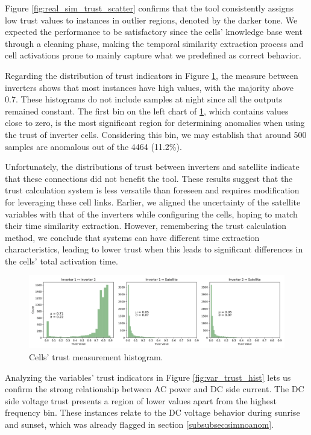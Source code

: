 Figure \ref{fig:real_sim_trust_scatter} confirms that the tool consistently assigns low trust values to instances in outlier regions, denoted by the darker tone. We expected the performance to be satisfactory since the cells' knowledge base went through a cleaning phase, making the temporal similarity extraction process and cell activations prone to mainly capture what we predefined as correct behavior.

Regarding the distribution of trust indicators in Figure \ref{fig:cell_trust_hist}, the measure between inverters shows that most instances have high values, with the majority above 0.7. These histograms do not include samples at night since all the outputs remained constant. The first bin on the left chart of \ref{fig:cell_trust_hist}, which contains values close to zero, is the most significant region for determining anomalies when using the trust of inverter cells. Considering this bin, we may establish that around 500 samples are anomalous out of the 4464 (11.2\%).

Unfortunately, the distributions of trust between inverters and satellite indicate that these connections did not benefit the tool. These results suggest that the trust calculation system is less versatile than foreseen and requires modification for leveraging these cell links. Earlier, we aligned the uncertainty of the satellite variables with that of the inverters while configuring the cells, hoping to match their time similarity extraction. However, remembering the trust calculation method, we conclude that systems can have different time extraction characteristics, leading to lower trust when this leads to significant differences in the cells' total activation time.

\begin{figure}[h!]
    \centering
    \includegraphics[width=\textwidth]{figures/chapter5/results/real/50_hist_trust_cells-1.png}
    \caption{Cells' trust measurement histogram.}
    \label{fig:cell_trust_hist}
\end{figure}

Analyzing the variables' trust indicators in Figure \ref{fig:var_trust_hist} lets us confirm the strong relationship between AC power and DC side current. The DC side voltage trust presents a region of lower values apart from the highest frequency bin. These instances relate to the DC voltage behavior during sunrise and sunset, which was already flagged in section \ref{subsubsec:simnoanom}.

